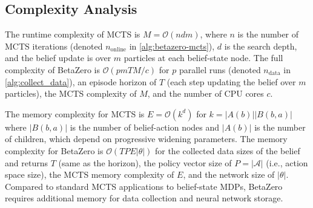 \begin{figure}[!p]
    \centering
    \begin{minipage}{\textwidth}
        
    \end{minipage}
\end{figure}

\begin{figure}[!p]
    \centering
    \begin{minipage}{\textwidth}
        
    \end{minipage}
\end{figure}

\begin{figure}[ht]
    \centering
    \begin{minipage}{\textwidth}
        
    \end{minipage}
\end{figure}

\subsection{Complexity Analysis}
The runtime complexity of MCTS is $M = \mathcal{O}(ndm)$, where $n$ is the number of MCTS iterations (denoted $n_\text{online}$ in \cref{alg:betazero-mcts}), $d$ is the search depth, and the belief update is over $m$ particles at each belief-state node.
The full complexity of BetaZero is $\mathcal{O}(pmTM/c)$ for $p$ parallel runs (denoted $n_\text{data}$ in \cref{alg:collect_data}), an episode horizon of $T$ (each step updating the belief over $m$ particles), the MCTS complexity of $M$, and the number of CPU cores $c$.

The memory complexity for MCTS is $E = \mathcal{O}(k^d)$ for $k = |A(b)||B(b,a)|$ where 
$|B(b,a)|$ is the number of belief-action nodes and $|A(b)|$ is the number of children, which depend on progressive widening parameters.
The memory complexity for BetaZero is $\mathcal{O}(TPE|\theta|)$ for the collected data sizes of the belief and returns $T$ (same as the horizon), the policy vector size of $P = |\mathcal{A}|$ (i.e., action space size), the MCTS memory complexity of $E$, and the network size of $|\theta|$.
Compared to standard MCTS applications to belief-state MDPs, BetaZero requires additional memory for data collection and neural network storage.



